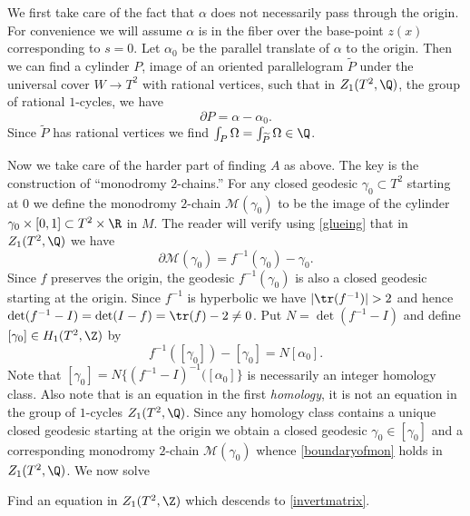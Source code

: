 We first take care of the fact that $\alpha$ does not necessarily
pass through the origin. For convenience we will assume $\alpha$
is in the fiber over the base-point $z(x)$ corresponding to $s=0$.
Let $\alpha_0$ be the parallel translate of $\alpha$ to the origin.
Then we can find a cylinder $P$, image of an oriented parallelogram
$\widetilde{P}$ under the universal cover $W \to T^2$ with rational
vertices, such that in $Z_1(T^2,\Q)$, the group of rational $1$-cycles,
we have
\begin{equation}\label{firstrectangle}
\partial P = \alpha - \alpha_0.
\end{equation}
Since $\widetilde{P}$ has rational vertices we find $\int_{P} \Omega
= \int_{\widetilde{P}} \Omega \in \Q$.

Now we take care of the harder part of finding $A$ as above. The
key is the construction  of ``monodromy $2$-chains.''  For any closed
geodesic $\gamma_0 \subset T^2$ starting at $0$ we define the
monodromy $2$-chain  $\mathcal{M}(\gamma_0)$ to be the image of the
cylinder $\gamma_0 \times [0,1] \subset T^2 \times \R$ in $M$.
The reader will verify using \eqref{glueing} that in $Z_1(T^2,\Q)$ we have 
\begin{equation} \label{boundaryofmon}
 \partial \mathcal{M}(\gamma_0) = f^{-1}(\gamma_0) -\gamma_0.
\end{equation}
Since $f$ preserves the origin, the geodesic $f^{-1}(\gamma_0)$ is
also a closed geodesic starting at the origin. Since $f^{-1}$ is
hyperbolic we have $|\tr(f^{-1})| >2$ and hence $\det(f^{-1} -I)=
\det( I - f) = \tr(f) -2 \neq 0$. Put $N= \det(f^{-1} -I)$ and define
$[\gamma_0] \in H_1(T^2,\Z)$ by
\begin{equation}\label{invertmatrix}
f^{-1}([\gamma_0]) -[\gamma_0] = N[\alpha_0]. 
\end{equation}
Note that $[\gamma_0] = N \{(f^{-1} - I)^{-1} ([\alpha_0] \}$ is
necessarily an integer homology class. Also note that is an equation
in the first {\it homology}, it is not an equation in the group of
$1$-cycles $Z_1(T^2,\Q)$. Since any homology class contains a unique
closed geodesic starting at the origin we obtain a closed geodesic
$\gamma_0 \in [\gamma_0]$  and a corresponding  monodromy $2$-chain
$\mathcal{M}(\gamma_0)$ whence \eqref{boundaryofmon} holds in
$Z_1(T^2,\Q)$. We now solve

\begin{problem}
Find an equation in $Z_1(T^2,\Z)$ which descends to  \eqref{invertmatrix}. 
\end{problem}
